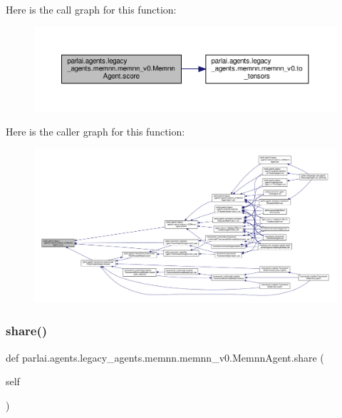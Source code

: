 Here is the call graph for this function\+:
\nopagebreak
\begin{figure}[H]
\begin{center}
\leavevmode
\includegraphics[width=350pt]{classparlai_1_1agents_1_1legacy__agents_1_1memnn_1_1memnn__v0_1_1MemnnAgent_a29485cab795b6c8abe0a61d9c6bb87fd_cgraph}
\end{center}
\end{figure}
Here is the caller graph for this function\+:
\nopagebreak
\begin{figure}[H]
\begin{center}
\leavevmode
\includegraphics[width=350pt]{classparlai_1_1agents_1_1legacy__agents_1_1memnn_1_1memnn__v0_1_1MemnnAgent_a29485cab795b6c8abe0a61d9c6bb87fd_icgraph}
\end{center}
\end{figure}
\mbox{\label{classparlai_1_1agents_1_1legacy__agents_1_1memnn_1_1memnn__v0_1_1MemnnAgent_a64ae5911364ed06f2a72afe9859e6cdd}} 
\subsubsection{\texorpdfstring{share()}{share()}}
{\footnotesize\ttfamily def parlai.\+agents.\+legacy\+\_\+agents.\+memnn.\+memnn\+\_\+v0.\+Memnn\+Agent.\+share (\begin{DoxyParamCaption}\item[{}]{self }\end{DoxyParamCaption})}



